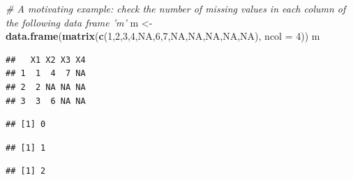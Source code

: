 \documentclass[]{book}
\newenvironment{Shaded}{\begin{snugshade}}{\end{snugshade}}
\newcommand{\CommentTok}[1]{\textcolor[rgb]{0.56,0.35,0.01}{\textit{#1}}}
\newcommand{\DataTypeTok}[1]{\textcolor[rgb]{0.13,0.29,0.53}{#1}}
\newcommand{\DecValTok}[1]{\textcolor[rgb]{0.00,0.00,0.81}{#1}}
\newcommand{\KeywordTok}[1]{\textcolor[rgb]{0.13,0.29,0.53}{\textbf{#1}}}
\newcommand{\NormalTok}[1]{#1}
\newcommand{\OperatorTok}[1]{\textcolor[rgb]{0.81,0.36,0.00}{\textbf{#1}}}
\newcommand{\OtherTok}[1]{\textcolor[rgb]{0.56,0.35,0.01}{#1}}
\newcommand{\StringTok}[1]{\textcolor[rgb]{0.31,0.60,0.02}{#1}}
\begin{document}
\begin{Shaded}
\begin{Highlighting}[]
\CommentTok{# A motivating example: check the number of missing values in each column of the following data frame 'm'}
\NormalTok{m <-}\StringTok{ }\KeywordTok{data.frame}\NormalTok{(}\KeywordTok{matrix}\NormalTok{(}\KeywordTok{c}\NormalTok{(}\DecValTok{1}\NormalTok{,}\DecValTok{2}\NormalTok{,}\DecValTok{3}\NormalTok{,}\DecValTok{4}\NormalTok{,}\OtherTok{NA}\NormalTok{,}\DecValTok{6}\NormalTok{,}\DecValTok{7}\NormalTok{,}\OtherTok{NA}\NormalTok{,}\OtherTok{NA}\NormalTok{,}\OtherTok{NA}\NormalTok{,}\OtherTok{NA}\NormalTok{,}\OtherTok{NA}\NormalTok{), }\DataTypeTok{ncol =} \DecValTok{4}\NormalTok{))}
\NormalTok{m}
\end{Highlighting}
\end{Shaded}

\begin{verbatim}
##   X1 X2 X3 X4
## 1  1  4  7 NA
## 2  2 NA NA NA
## 3  3  6 NA NA
\end{verbatim}

\begin{Shaded}
\end{Shaded}

\begin{verbatim}
## [1] 0
\end{verbatim}

\begin{Shaded}
\end{Shaded}

\begin{verbatim}
## [1] 1
\end{verbatim}

\begin{Shaded}
\end{Shaded}

\begin{verbatim}
## [1] 2
\end{verbatim}
\end{document}

